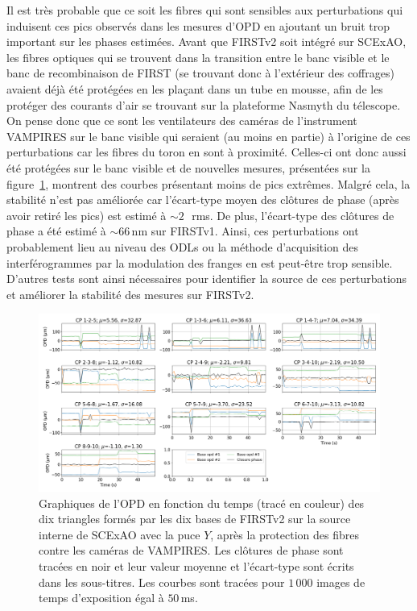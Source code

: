 Il est très probable que ce soit les fibres qui sont sensibles aux perturbations qui induisent ces pics observés dans les mesures d'\ac{OPD} en ajoutant un bruit trop important sur les phases estimées. Avant que \ac{FIRSTv2} soit intégré sur \ac{SCExAO}, les fibres optiques qui se trouvent dans la transition entre le banc visible et le banc de recombinaison de \ac{FIRST} (se trouvant donc à l'extérieur des coffrages) avaient déjà été protégées en les plaçant dans un tube en mousse, afin de les protéger des courants d'air se trouvant sur la plateforme Nasmyth du télescope. On pense donc que ce sont les ventilateurs des caméras de l'instrument \ac{VAMPIRES} sur le banc visible qui seraient (au moins en partie) à l'origine de ces perturbations car les fibres du toron en sont à proximité. Celles-ci ont donc aussi été protégées sur le banc visible et de nouvelles mesures, présentées sur la figure~\ref{fig:OPDfitVStimeSubaruProtect}, montrent des courbes présentant moins de pics extrêmes. Malgré cela, la stabilité n'est pas améliorée car l'écart-type moyen des clôtures de phase (après avoir retiré les pics) est estimé à $\sim 2 \,$\um~rms. De plus, l'écart-type des clôtures de phase a été estimé à $\sim 66 \,$nm sur \ac{FIRSTv1}. Ainsi, ces perturbations ont probablement lieu au niveau des \ac{ODL}s ou la méthode d'acquisition des interférogrammes par la modulation des franges en est peut-être trop sensible. D'autres tests sont ainsi nécessaires pour identifier la source de ces perturbations et améliorer la stabilité des mesures sur \ac{FIRSTv2}.

\begin{figure}[ht!]
    \centering
    \includegraphics[width=\figwidth]{Figure_Chap5/20220404_FullOnData_OPDFitCPvsTime_Pola1_Base_LaTex.png}
    \caption[Graphiques de l'OPD en fonction du temps des dix triangles formés par les dix bases de FIRSTv2 sur la source interne de SCExAO avec la puce $Y$, après la protection des fibres.]{Graphiques de l'OPD en fonction du temps (tracé en couleur) des dix triangles formés par les dix bases de FIRSTv2 sur la source interne de SCExAO avec la puce $Y$, après la protection des fibres contre les caméras de VAMPIRES. Les clôtures de phase sont tracées en noir et leur valeur moyenne et l'écart-type sont écrits dans les sous-titres. Les courbes sont tracées pour $1\,000$ images de temps d'exposition égal à $50 \,$ms.}
    \label{fig:OPDfitVStimeSubaruProtect}
\end{figure}


